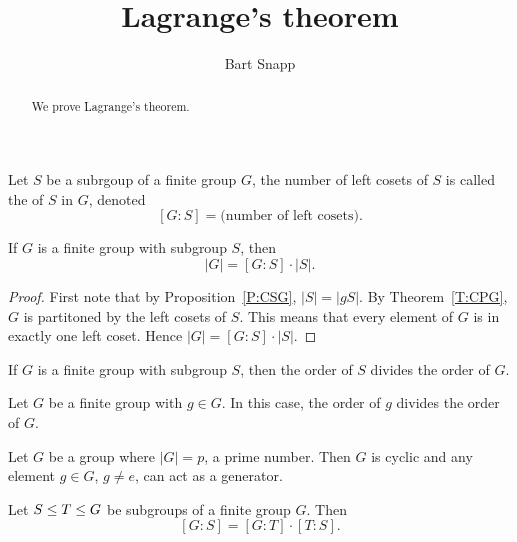 \documentclass{ximera}
\author{Bart Snapp}
\title{Lagrange's theorem}
\begin{document}
\begin{abstract}
  We prove Lagrange's theorem.
\end{abstract}
\maketitle

\begin{definition}
  Let $S$ be a subrgoup of a finite group $G$, the number of left
  cosets of $S$ is called the  of $S$ in $G$, denoted
  \[
  [G:S] = \text{(number of left cosets)}.
  \]
\end{definition}



\begin{theorem}
  If $G$ is a finite group with subgroup $S$, then 
  \[
  |G| = [G:S]\cdot |S|.
  \]
  \begin{proof}
    First note that by Proposition~\ref{P:CSG}, $|S| = |gS|$. By
    Theorem~\ref{T:CPG}, $G$ is partitoned by the left cosets of
    $S$. This means that every element of $G$ is in exactly one left
    coset. Hence $|G| = [G:S]\cdot |S|$.
  \end{proof}
\end{theorem}

\begin{corollary}
  If $G$ is a finite group with subgroup $S$, then the order of $S$
  divides the order of $G$.
\end{corollary}

\begin{corollary}
  Let $G$ be a finite group with $g\in G$. In this case, the order of
  $g$ divides the order of $G$.
\end{corollary}

\begin{corollary}
  Let $G$ be a group where $|G|= p$, a prime number. Then $G$ is
  cyclic and any element $g\in G$, $g\ne e$, can act as a generator.
\end{corollary}

\begin{corollary}
  Let $S \leq T \leq G$ be subgroups of a finite group
  $G$. Then
  \[
  [G:S] = [G:T]\cdot [T:S].
  \]
\end{corollary}
\end{document}
